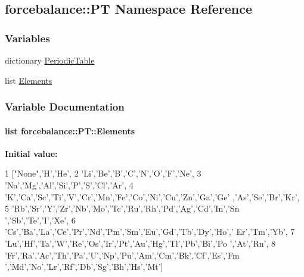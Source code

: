 \hypertarget{namespaceforcebalance_1_1PT}{\subsection{forcebalance\-:\-:\-P\-T \-Namespace \-Reference}
\label{namespaceforcebalance_1_1PT}
}
\subsubsection*{\-Variables}
\begin{DoxyCompactItemize}
\item 
dictionary \hyperlink{namespaceforcebalance_1_1PT_aa2d0659df85804d6f36a4a2d9d4f463a}{\-Periodic\-Table}
\item 
list \hyperlink{namespaceforcebalance_1_1PT_a04e89228643f9d95c8df7cd6301eef37}{\-Elements}
\end{DoxyCompactItemize}


\subsubsection{\-Variable \-Documentation}
\hypertarget{namespaceforcebalance_1_1PT_a04e89228643f9d95c8df7cd6301eef37}{
\paragraph[{\-Elements}]{\setlength{\rightskip}{0pt plus 5cm}list {\bf forcebalance\-::\-P\-T\-::\-Elements}}}\label{namespaceforcebalance_1_1PT_a04e89228643f9d95c8df7cd6301eef37}
{\bfseries \-Initial value\-:}
\begin{DoxyCode}
1 ["None",'H','He',
2             'Li','Be','B','C','N','O','F','Ne',
3             'Na','Mg','Al','Si','P','S','Cl','Ar',
4             'K','Ca','Sc','Ti','V','Cr','Mn','Fe','Co','Ni','Cu','Zn','Ga','Ge'
      ,'As','Se','Br','Kr',
5             'Rb','Sr','Y','Zr','Nb','Mo','Tc','Ru','Rh','Pd','Ag','Cd','In','Sn
      ','Sb','Te','I','Xe',
6             'Cs','Ba','La','Ce','Pr','Nd','Pm','Sm','Eu','Gd','Tb','Dy','Ho','
      Er','Tm','Yb',
7             'Lu','Hf','Ta','W','Re','Os','Ir','Pt','Au','Hg','Tl','Pb','Bi','Po
      ','At','Rn',
8             'Fr','Ra','Ac','Th','Pa','U','Np','Pu','Am','Cm','Bk','Cf','Es','Fm
      ','Md','No','Lr','Rf','Db','Sg','Bh','Hs','Mt']
\end{DoxyCode}


